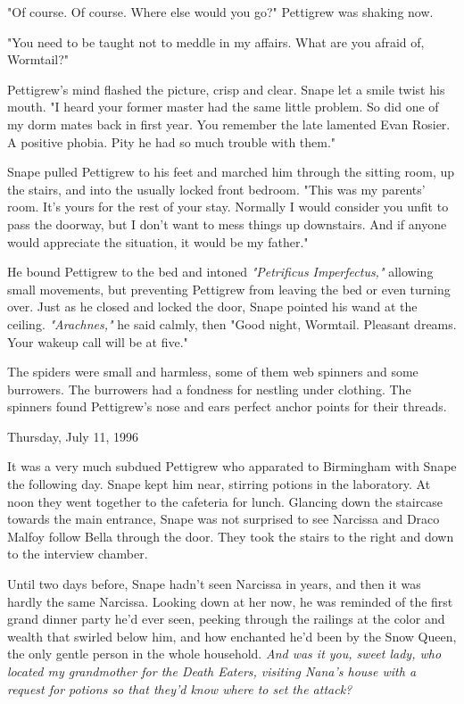 \documentclass[a4paper,11pt]{article}
\begin{document}
"Of course. Of course. Where else would you go?" Pettigrew was shaking now.

"You need to be taught not to meddle in my affairs. What are you afraid of, Wormtail?"

Pettigrew's mind flashed the picture, crisp and clear. Snape let a smile twist his mouth. "I heard your former master had the same little problem. So did one of my dorm mates back in first year. You remember the late lamented Evan Rosier. A positive phobia. Pity he had so much trouble with them."

Snape pulled Pettigrew to his feet and marched him through the sitting room, up the stairs, and into the usually locked front bedroom. "This was my parents' room. It's yours for the rest of your stay. Normally I would consider you unfit to pass the doorway, but I don't want to mess things up downstairs. And if anyone would appreciate the situation, it would be my father."

He bound Pettigrew to the bed and intoned \emph{"Petrificus Imperfectus,"} allowing small movements, but preventing Pettigrew from leaving the bed or even turning over. Just as he closed and locked the door, Snape pointed his wand at the ceiling. \emph{"Arachnes,"} he said calmly, then "Good night, Wormtail. Pleasant dreams. Your wakeup call will be at five."

The spiders were small and harmless, some of them web spinners and some burrowers. The burrowers had a fondness for nestling under clothing. The spinners found Pettigrew's nose and ears perfect anchor points for their threads.

Thursday, July 11, 1996

It was a very much subdued Pettigrew who apparated to Birmingham with Snape the following day. Snape kept him near, stirring potions in the laboratory. At noon they went together to the cafeteria for lunch. Glancing down the staircase towards the main entrance, Snape was not surprised to see Narcissa and Draco Malfoy follow Bella through the door. They took the stairs to the right and down to the interview chamber.

Until two days before, Snape hadn't seen Narcissa in years, and then it was hardly the same Narcissa. Looking down at her now, he was reminded of the first grand dinner party he'd ever seen, peeking through the railings at the color and wealth that swirled below him, and how enchanted he'd been by the Snow Queen, the only gentle person in the whole household. \emph{And was it you, sweet lady, who located my grandmother for the Death Eaters, visiting Nana's house with a request for potions so that they'd know where to set the attack?}
\end{document}
